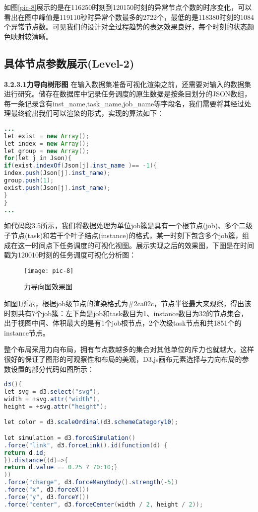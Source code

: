 如图\ref{pic-8}展示的是在116250时刻到120150时刻的异常节点个数的时序变化，可以看出在图中峰值是119110秒时异常个数最多的2722个，最低的是118380时刻的1084个异常节点数。可见我们的设计对全过程趋势的表达效果良好，每个时刻的状态颜色映射较清晰。

\newpage
\subsection{具体节点参数展示(Level-2)}
{\textbf{3.2.3.1\quad 力导向树形图}}
在输入数据集准备可视化渲染之前，还需要对输入的数据集进行研究。储存在数据库中记录任务调度的原生数据是按条目划分的JSON数组，每一条记录含有inst\_name,task\_name,job\_name等字段名，我们需要将其经过处理最终输出我们可以渲染的形式，实现的算法如下：

\begin{lstlisting}[caption=格式化row data,frame=shadowbox,language={java}]
...
let exist = new Array();
let index = new Array();
let group = new Array();
for(let j in Json){
if(exist.indexOf(Json[j].inst_name )== -1){
index.push(Json[j].inst_name);
group.push(1);
exist.push(Json[j].inst_name);
}
}
...
\end{lstlisting}

如代码段3.5所示，我们将数据处理为单位job簇是具有一个根节点(job)、多个二级子节点(task)和若干个叶子结点(instance)的格式，某一时刻下包含多个job簇，组成在这一时间点下任务调度的可视化视图。展示实现之后的效果图，下图是在时间戳为120010时刻的任务调度可视化分析图：

\begin{figure}[h]
	\centering
	\texttt{[image: pic-8]}
	\caption{力导向图效果图}
	\label{pic-9}
\end{figure}

如图\ref{pic-9}所示，根据job级节点的渲染格式为\#2ca02c，节点半径最大来观察，得出该时刻共有7个job簇：左下角是job和task数目为1、instance数目为32的节点集合，出于视图中间、体积最大的是有1个job根节点，2个次级task节点和共1851个的instance节点。

整个布局采用力向布局，拥有节点数越多的集合对其他单位的斥力也就越大，这样很好的保证了图形的可观察性和布局的美观，D3.js画布元素选择与力向布局的参数设置的部分代码如图所示：

\begin{lstlisting}[caption=基于D3关于svg图形的实现,frame=shadowbox,language={java}]
d3(){
let svg = d3.select("svg"),
width = +svg.attr("width"),
height = +svg.attr("height");

let color = d3.scaleOrdinal(d3.schemeCategory10);

let simulation = d3.forceSimulation()
.force("link", d3.forceLink().id(function(d) {
return d.id;
}).distance((d)=>{
return d.value == 0.25 ? 70:10;}
))
.force("charge", d3.forceManyBody().strength(-5))
.force("x", d3.forceX())
.force("y", d3.forceY())
.force("center", d3.forceCenter(width / 2, height / 2));
\end{lstlisting}

